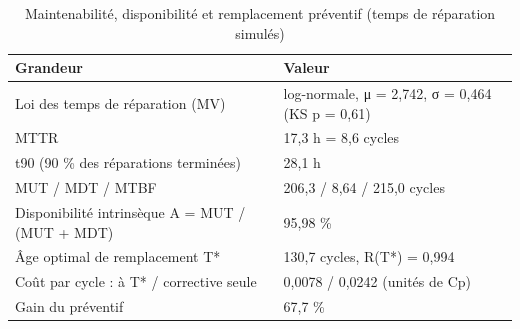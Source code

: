 \begin{table}[htbp]
\centering
\caption{Maintenabilité, disponibilité et remplacement préventif (temps de réparation simulés)}
\label{tab:fmds_maintenabilite_disponibilite}
\begin{tabular}{ll}
\toprule
Grandeur & Valeur \\
\midrule
Loi des temps de réparation (MV) & log-normale, μ = 2,742, σ = 0,464 (KS p = 0,61) \\
MTTR & 17,3 h = 8,6 cycles \\
t90 (90 \% des réparations terminées) & 28,1 h \\
MUT / MDT / MTBF & 206,3 / 8,64 / 215,0 cycles \\
Disponibilité intrinsèque A = MUT / (MUT + MDT) & 95,98 \% \\
Âge optimal de remplacement T* & 130,7 cycles, R(T*) = 0,994 \\
Coût par cycle : à T* / corrective seule & 0,0078 / 0,0242 (unités de Cp) \\
Gain du préventif & 67,7 \% \\
\bottomrule
\end{tabular}
\end{table}
